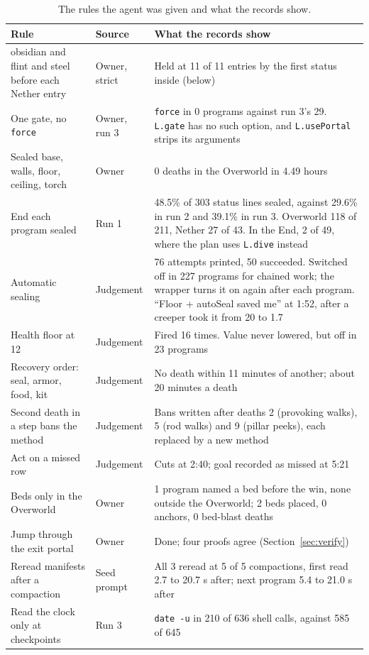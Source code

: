 \documentclass[11pt,a4paper]{article}
\begin{document}
\begin{table}[t]
  \caption{The rules the agent was given and what the records show.}
  \label{tab:rules}
  \footnotesize
  \begin{tabularx}{\textwidth}{@{}>{\raggedright\arraybackslash}p{3.9cm}>{\raggedright\arraybackslash}p{1.55cm}X@{}}
    \toprule
    \textbf{Rule} & \textbf{Source} & \textbf{What the records show} \\
    \midrule
    10 obsidian and flint and steel before each Nether entry & Owner, strict & Held at 11 of 11 entries by the first status inside (below) \\
    One gate, no \texttt{force} & Owner, run 3 & \texttt{force} in 0 programs against run 3's 29. \texttt{L.gate} has no such option, and \texttt{L.usePortal} strips its arguments \\
    Sealed base, walls, floor, ceiling, torch & Owner & 0 deaths in the Overworld in 4.49 hours \\
    End each program sealed & Run 1 & 48.5\% of 303 status lines sealed, against 29.6\% in run 2 and 39.1\% in run 3. Overworld 118 of 211, Nether 27 of 43. In the End, 2 of 49, where the plan uses \texttt{L.dive} instead \\
    Automatic sealing & Judgement & 76 attempts printed, 50 succeeded. Switched off in 227 programs for chained work; the wrapper turns it on again after each program. ``Floor + autoSeal saved me'' at 1:52, after a creeper took it from 20 to 1.7 \\
    Health floor at 12 & Judgement & Fired 16 times. Value never lowered, but off in 23 programs \\
    Recovery order: seal, armor, food, kit & Judgement & No death within 11 minutes of another; about 20 minutes a death \\
    Second death in a step bans the method & Judgement & Bans written after deaths 2 (provoking walks), 5 (rod walks) and 9 (pillar peeks), each replaced by a new method \\
    Act on a missed row & Judgement & Cuts at 2:40; goal recorded as missed at 5:21 \\
    Beds only in the Overworld & Owner & 1 program named a bed before the win, none outside the Overworld; 2 beds placed, 0 anchors, 0 bed-blast deaths \\
    Jump through the exit portal & Owner & Done; four proofs agree (Section~\ref{sec:verify}) \\
    Reread manifests after a compaction & Seed prompt & All 3 reread at 5 of 5 compactions, first read 2.7 to 20.7 s after; next program 5.4 to 21.0 s after \\
    Read the clock only at checkpoints & Run 3 & \texttt{date -u} in 210 of 636 shell calls, against 585 of 645 \\
    \bottomrule
  \end{tabularx}
\end{table}
\end{document}
